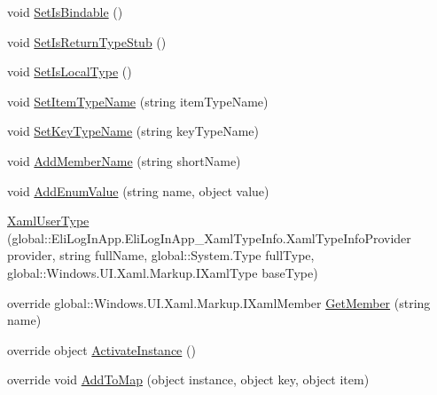 \begin{DoxyCompactItemize}
\item 
void \hyperlink{class_eli_log_in_app_1_1_eli_log_in_app___xaml_type_info_1_1_xaml_user_type_ad54def0c9c9ef0a07f42548f895f38d9}{Set\+Is\+Bindable} ()
\item 
void \hyperlink{class_eli_log_in_app_1_1_eli_log_in_app___xaml_type_info_1_1_xaml_user_type_a90707b6102a07fad88fe220d29902a5f}{Set\+Is\+Return\+Type\+Stub} ()
\item 
void \hyperlink{class_eli_log_in_app_1_1_eli_log_in_app___xaml_type_info_1_1_xaml_user_type_aa272264ba98bdfdfd550dcc3914cad12}{Set\+Is\+Local\+Type} ()
\item 
void \hyperlink{class_eli_log_in_app_1_1_eli_log_in_app___xaml_type_info_1_1_xaml_user_type_aef80979457c3078752cdaf45a5fa27a4}{Set\+Item\+Type\+Name} (string item\+Type\+Name)
\item 
void \hyperlink{class_eli_log_in_app_1_1_eli_log_in_app___xaml_type_info_1_1_xaml_user_type_a73575a24633520fdf4fd1b3cd57a09bd}{Set\+Key\+Type\+Name} (string key\+Type\+Name)
\item 
void \hyperlink{class_eli_log_in_app_1_1_eli_log_in_app___xaml_type_info_1_1_xaml_user_type_af98e518e1be5e292f754d5f4e82ac1ef}{Add\+Member\+Name} (string short\+Name)
\item 
void \hyperlink{class_eli_log_in_app_1_1_eli_log_in_app___xaml_type_info_1_1_xaml_user_type_a1261e283fe193030c59f5df8e2fc74ac}{Add\+Enum\+Value} (string name, object value)
\item 
\hyperlink{class_eli_log_in_app_1_1_eli_log_in_app___xaml_type_info_1_1_xaml_user_type_aead17ccf55a45757a3f89915c58ff296}{Xaml\+User\+Type} (global\+::\+Eli\+Log\+In\+App.\+Eli\+Log\+In\+App\+\_\+\+Xaml\+Type\+Info.\+Xaml\+Type\+Info\+Provider provider, string full\+Name, global\+::\+System.\+Type full\+Type, global\+::\+Windows.\+U\+I.\+Xaml.\+Markup.\+I\+Xaml\+Type base\+Type)
\item 
override global\+::\+Windows.\+U\+I.\+Xaml.\+Markup.\+I\+Xaml\+Member \hyperlink{class_eli_log_in_app_1_1_eli_log_in_app___xaml_type_info_1_1_xaml_user_type_ace8732f899047742b6d12a0266060652}{Get\+Member} (string name)
\item 
override object \hyperlink{class_eli_log_in_app_1_1_eli_log_in_app___xaml_type_info_1_1_xaml_user_type_a318677d00a320935c3ecf51ec8b0425d}{Activate\+Instance} ()
\item 
override void \hyperlink{class_eli_log_in_app_1_1_eli_log_in_app___xaml_type_info_1_1_xaml_user_type_a39e9eebc47fc7506686650e59ce7d956}{Add\+To\+Map} (object instance, object key, object item)

\end{DoxyCompactItemize}
